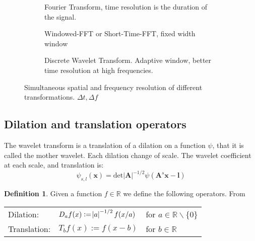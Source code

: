 \documentclass{InsightArticle}
\theoremstyle{definition}
\newtheorem{definition}{Definition}[section]
\begin{document}
\begin{figure}[H]
  \begin{subfigure}[t]{.33\textwidth}
    \centering
    
    \captionsetup{width=0.8\textwidth}
    \caption{Fourier Transform, time resolution is the duration of the signal.}
    \label{fig:grid_a_fft}
  \end{subfigure}
  \begin{subfigure}[t]{.33\textwidth}
    \centering
    
    \captionsetup{width=0.8\textwidth}
    \caption{Windowed-FFT or Short-Time-FFT, fixed width window}
    \label{fig:grid_b_windowed}
  \end{subfigure}
  \begin{subfigure}[t]{.33\textwidth}
    \centering
    
    \captionsetup{width=0.8\textwidth}
    \caption{Discrete Wavelet Transform. Adaptive window, better time resolution at high frequencies.}
    \label{fig:grid_c_wavelet}
  \end{subfigure}
  \caption{Simultaneous spatial and frequency resolution of different transformations. $\Delta t, \Delta f$}
  \label{fig:grids}
\end{figure}

\subsection{Dilation and translation operators}
The wavelet transform is a translation of a dilation on a function $\psi$, that it is called the mother wavelet. Each dilation change of scale. The wavelet coefficient at each scale, and translation is:
\begin{equation}
  \psi_{s,l}(\bm{x}) = \text{det}|\bm{A}|^{-1/2}\psi(\bm{A}^s\bm{x} - \bm{l})
\end{equation}

\begin{definition}
  Given a function $f \in \mathbb{R}$ we define the following operators. From \cite{heil_continuous_1989} \par
  \begin{tabular}{lll}
    Dilation:&  $D_a f(x):=\abs{a}^{-1/2}f(x/a)$ &for $a \in \mathbb{R}\backslash\{0\}$ \\
    Translation:&   $T_b f(x):=f(x-b)$ &for $b \in \mathbb{R}$ \\
  \end{tabular}
\end{definition}
\end{document}

